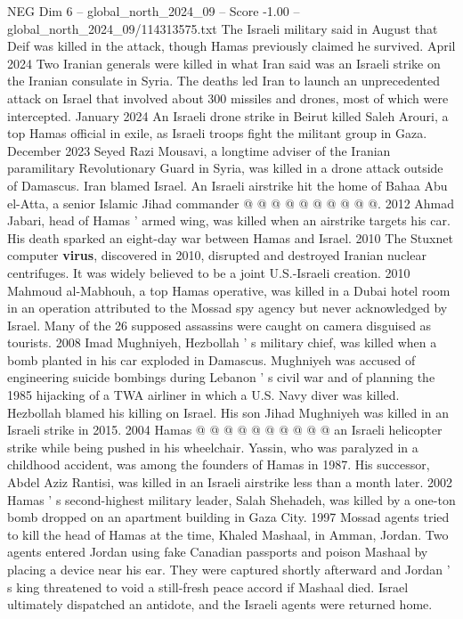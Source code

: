\begin{textsample}{NEG Dim 6 – global\_north\_2024\_09 – Score -1.00 – global\_north\_2024\_09/114313575.txt}
The Israeli military said in August that Deif was killed in the attack, though Hamas previously claimed he survived.
April 2024 Two Iranian generals were killed in what Iran said was an Israeli strike on the Iranian consulate in Syria.
The deaths led Iran to launch an unprecedented attack on Israel that involved about 300 missiles and drones, most of which were intercepted.
January 2024 An Israeli drone strike in Beirut killed Saleh Arouri, a top Hamas official in exile, as Israeli troops fight the militant group in Gaza.
December 2023 Seyed Razi Mousavi, a longtime adviser of the Iranian paramilitary Revolutionary Guard in Syria, was killed in a drone attack outside of Damascus.
Iran blamed Israel.
An Israeli airstrike hit the home of Bahaa Abu el-Atta, a senior Islamic Jihad commander @ @ @ @ @ @ @ @ @ @. 2012 Ahmad Jabari, head of Hamas ' armed wing, was killed when an airstrike targets his car.
His death sparked an eight-day war between Hamas and Israel. 2010 The Stuxnet computer \textbf{virus}, discovered in 2010, disrupted and destroyed Iranian nuclear centrifuges.
It was widely believed to be a joint U.S.-Israeli creation. 2010 Mahmoud al-Mabhouh, a top Hamas operative, was killed in a Dubai hotel room in an operation attributed to the Mossad spy agency but never acknowledged by Israel.
Many of the 26 supposed assassins were caught on camera disguised as tourists. 2008 Imad Mughniyeh, Hezbollah ' s military chief, was killed when a bomb planted in his car exploded in Damascus.
Mughniyeh was accused of engineering suicide bombings during Lebanon ' s civil war and of planning the 1985 hijacking of a TWA airliner in which a U.S.
Navy diver was killed.
Hezbollah blamed his killing on Israel.
His son Jihad Mughniyeh was killed in an Israeli strike in 2015. 2004 Hamas @ @ @ @ @ @ @ @ @ @ an Israeli helicopter strike while being pushed in his wheelchair.
Yassin, who was paralyzed in a childhood accident, was among the founders of Hamas in 1987.
His successor, Abdel Aziz Rantisi, was killed in an Israeli airstrike less than a month later. 2002 Hamas ' s second-highest military leader, Salah Shehadeh, was killed by a one-ton bomb dropped on an apartment building in Gaza City. 1997 Mossad agents tried to kill the head of Hamas at the time, Khaled Mashaal, in Amman, Jordan.
Two agents entered Jordan using fake Canadian passports and poison Mashaal by placing a device near his ear.
They were captured shortly afterward and Jordan ' s king threatened to void a still-fresh peace accord if Mashaal died.
Israel ultimately dispatched an antidote, and the Israeli agents were returned home.

\end{textsample}
